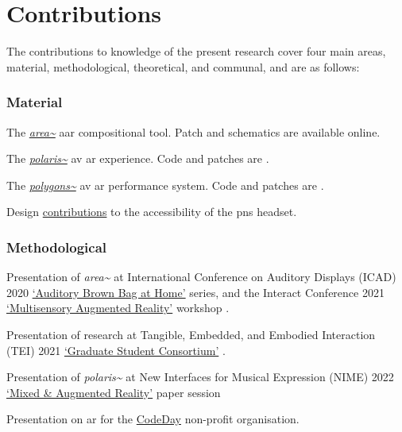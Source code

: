 \section{Contributions}\label{sec: intro-contrib}
The contributions to knowledge of the present research cover four main areas, material, methodological, theoretical, and communal, and are as follows:
\begin{SingleSpace}
    \subsubsection{Material}
        \begin{noitemize}
            \item The \textit{\hyperref[sec: area]{\textit{area\textasciitilde{}}}} \gls{aar} compositional tool. Patch and schematics are available online. 
            \item The \textit{\hyperref[sec: polaris]{\textit{polaris\textasciitilde{}}}} \gls{av} \gls{ar} experience. Code and patches are .
            \item The \textit{\hyperref[sec: polygons]{\textit{polygons\textasciitilde{}}}} \gls{av} \gls{ar} performance system. Code and patches are .
            \item Design \href{https://github.com/AheadIO/Deck-X/tree/main/Deck_X/STL_files/Headgear/Welding_Headgear_Adaptor}{contributions} to the accessibility of the \gls{pns} headset.
        \end{noitemize}
\subsubsection{Methodological}
    \begin{noitemize}
        \item Presentation of \textit{area\textasciitilde{}} at International Conference on Auditory Displays (ICAD) 2020 \href{https://icad.org/abba-august-2020/}{`Auditory Brown Bag at Home'} series, and the Interact Conference 2021 \href{https://youtu.be/IQPof8-esM0?t=1690}{`Multisensory Augmented Reality'} workshop \citep[evaluated in][]{bilbow2021a}.
        \item Presentation of research at Tangible, Embedded, and Embodied Interaction (TEI) 2021 \href{https://www.youtube.com/watch?v=zyO43URZZDk}{`Graduate Student Consortium'} \citep[outlined in][]{bilbow2021b}.
        \item Presentation of \textit{polaris\textasciitilde{}} at New Interfaces for Musical Expression (NIME) 2022 \href{https://www.youtube.com/watch?v=eCdQku5hFOE}{`Mixed \& Augmented Reality'} paper session \citep[evaluated in][]{bilbow2022}
        \item Presentation on  \gls{ar} for the \href{https://www.youtube.com/watch?v=A826j_RwxeA}{CodeDay} non-profit organisation.
    \end{noitemize}

\end{SingleSpace}
